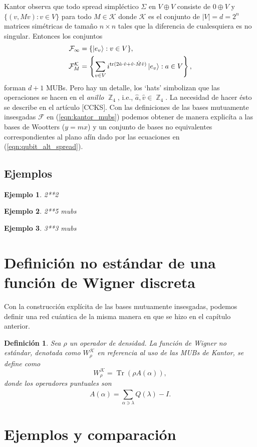 \documentclass[a4paper]{report}
\DeclareMathOperator{\Z}{\mathbb{Z}}
\DeclareMathOperator{\Tr}{Tr}
\DeclareMathOperator{\tr}{tr}
\newtheorem{definition}{Definición}
\newtheorem{example}{Ejemplo}
\begin{document}
  Kantor observa que todo spread simpléctico $\Sigma$ en $V
  \oplus V$ consiste de $0 \oplus V$ y $\{(v, Mv) : v \in
  V\}$ para todo $M \in \mathcal K$ donde $\mathcal K$ es el
  conjunto de $|V| = d = 2^{n}$ matrices simétricas de
  tamaño $n \times n$ tales que la diferencia de
  cualesquiera es no singular. Entonces los conjuntos 
  \begin{align}
    \label{eqn:kantor_mubs}
    \mathcal F_\infty &=
    \{\ket{e_v} : v \in V\}, \\
    \mathcal F_M^{\mathcal K} &=
    \left\{
      \sum_{v \in V}^{} i^{\tr(2 \hat a \cdot \hat v + \hat
      v \cdot \hat M \hat v)} \ket{e_v} : a \in V
    \right\},
  \end{align}
  forman $d + 1$ MUBs. Pero hay un detalle, los `hats'
  simbolizan que las operaciones se hacen en el
  \textit{anillo} $\Z_4$, i.e., $\hat a, \hat v \in \Z_4$.
  La necesidad de hacer ésto se describe en el artículo
  [CCKS]. Con las definiciones de las bases mutuamente
  insesgadas $\mathcal F$ en (\ref{eqn:kantor_mubs}) podemos
  obtener de manera explicíta a las bases de Wootters ($y =
  mx$) y un conjunto de bases no equivalentes
  correspondientes al plano afín dado por las ecuaciones en
  (\ref{eqn:qubit_alt_spread}). 

  \subsection{Ejemplos}

  \begin{example}
    2**2
  \end{example}
  
  \begin{example}
    2**5 mubs
  \end{example}

  \begin{example}
    3**3 mubs
  \end{example}

  \section{Definición no estándar de una función de Wigner
  discreta}

  Con la construcción explícita de las bases mutuamente
  insesgadas, podemos definir una red cuántica de la misma
  manera en que se hizo en el capítulo anterior. 

  \begin{definition}
    Sea $\rho$ un operador de densidad. La función de Wigner
    no estándar, denotada como $W_\rho^{\mathcal K}$ en
    referencia al uso de las MUBs de Kantor, se define como
    \begin{equation}
      W_\rho^{\mathcal K}
      = \Tr\left( \rho A(\alpha) \right),
    \end{equation}
    donde los operadores puntuales son
    \begin{equation}
      A(\alpha)
      = \sum_{\alpha \ni \lambda}^{} Q(\lambda) - I.
    \end{equation}
  \end{definition}

  \section{Ejemplos y comparación}

  \newpage
  \appendix
  

  \newpage
  \printbibliography
\end{document}
